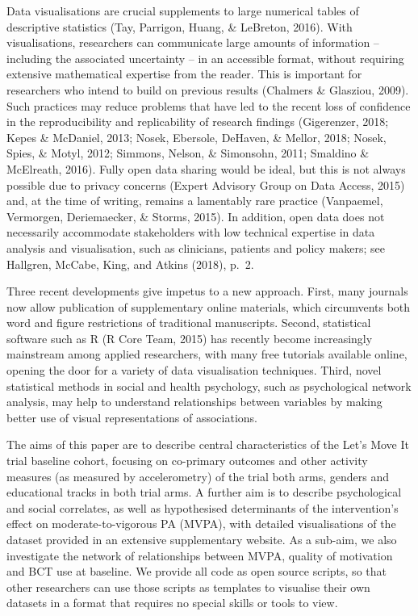 \documentclass[british,man]{apa6}
\begin{document}
Data visualisations are crucial supplements to large numerical tables of descriptive statistics (Tay, Parrigon, Huang, \& LeBreton, 2016). With visualisations, researchers can communicate large amounts of information -- including the associated uncertainty -- in an accessible format, without requiring extensive mathematical expertise from the reader. This is important for researchers who intend to build on previous results (Chalmers \& Glasziou, 2009). Such practices may reduce problems that have led to the recent loss of confidence in the reproducibility and replicability of research findings (Gigerenzer, 2018; Kepes \& McDaniel, 2013; Nosek, Ebersole, DeHaven, \& Mellor, 2018; Nosek, Spies, \& Motyl, 2012; Simmons, Nelson, \& Simonsohn, 2011; Smaldino \& McElreath, 2016). Fully open data sharing would be ideal, but this is not always possible due to privacy concerns (Expert Advisory Group on Data Access, 2015) and, at the time of writing, remains a lamentably rare practice (Vanpaemel, Vermorgen, Deriemaecker, \& Storms, 2015). In addition, open data does not necessarily accommodate stakeholders with low technical expertise in data analysis and visualisation, such as clinicians, patients and policy makers; see Hallgren, McCabe, King, and Atkins (2018), p.~2.

Three recent developments give impetus to a new approach. First, many journals now allow publication of supplementary online materials, which circumvents both word and figure restrictions of traditional manuscripts. Second, statistical software such as R (R Core Team, 2015) has recently become increasingly mainstream among applied researchers, with many free tutorials available online, opening the door for a variety of data visualisation techniques. Third, novel statistical methods in social and health psychology, such as psychological network analysis, may help to understand relationships between variables by making better use of visual representations of associations.

The aims of this paper are to describe central characteristics of the Let's Move It trial baseline cohort, focusing on co-primary outcomes and other activity measures (as measured by accelerometry) of the trial both arms, genders and educational tracks in both trial arms. A further aim is to describe psychological and social correlates, as well as hypothesised determinants of the intervention's effect on moderate-to-vigorous PA (MVPA), with detailed visualisations of the dataset provided in an extensive supplementary website. As a sub-aim, we also investigate the network of relationships between MVPA, quality of motivation and BCT use at baseline. We provide all code as open source scripts, so that other researchers can use those scripts as templates to visualise their own datasets in a format that requires no special skills or tools to view.
\end{document}
